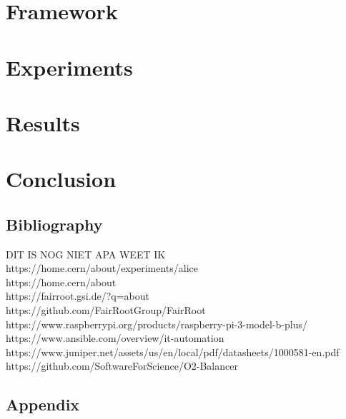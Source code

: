 \documentclass{report}
\begin{document}


\newpage

\chapter{Framework}



\newpage

\chapter{Experiments}



\newpage

\chapter{Results}



\newpage

\chapter{Conclusion}

\section*{Bibliography}
DIT IS NOG NIET APA WEET IK\\
https://home.cern/about/experiments/alice\\
https://home.cern/about\\
https://fairroot.gsi.de/?q=about\\
https://github.com/FairRootGroup/FairRoot\\
https://www.raspberrypi.org/products/raspberry-pi-3-model-b-plus/\\
https://www.ansible.com/overview/it-automation\\
https://www.juniper.net/assets/us/en/local/pdf/datasheets/1000581-en.pdf\\
https://github.com/SoftwareForScience/O2-Balancer\\

\section{Appendix}


\end{document}
